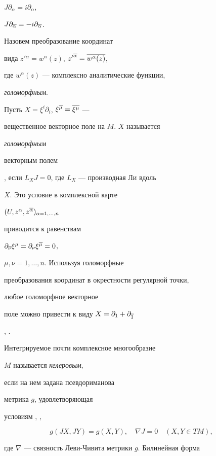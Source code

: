 $J\partial_\alpha= i\partial_\alpha$,


$J\partial_{\overline \alpha}= -i\partial_{\overline \alpha}$.





Назовем преобразование координат


вида $z'{}^{\alpha}=w^{\alpha}(z)$, ${z'}^{\overline\alpha}=\overline{w^\alpha (z)}$,


где $w^{\alpha}(z)$ --- комплексно аналитические функции,


{\it голоморфным}.


Пусть $X = \xi^i\partial_i$, $\xi^{\overline\mu} = \overline{\xi^\mu}$ ---


вещественное векторное поле на $M$. $X$ называется


{\it голоморфным


векторным полем}, если $L_X J= 0$, где $L_X$ --- производная Ли вдоль


$X$. Это условие в комплексной карте


$(U, z^{\alpha},z^{\overline\alpha})_{\alpha=1,\dotsc,n}$


приводится к равенствам


$\partial_{\overline\nu} \xi^\mu= \partial_{\nu} \xi^{\overline\mu} =0$,


$\mu,\nu =1,\dotsc,n$. Используя голоморфные


преобразования координат в окрестности регулярной точки,


любое голоморфное векторное


поле можно привести к виду $X=\partial_ 1 + \partial_{\overline 1}$


\cite{well}, \cite{skm}.





Интегрируемое почти комплексное многообразие


$M$ называется {\it келеровым},


если на нем задана псевдориманова


метрика $g$, удовлетворяющая


условиям \cite{sin1}, \cite{kobn}, \cite{well}


\begin{equation}


\label{sogl1}


g(JX,JY)=g(X,Y), \quad \nabla J = 0\quad (X,Y \in TM),


\end{equation}


где $\nabla$ --- связность Леви-Чивита метрики $g$. Билинейная форма


